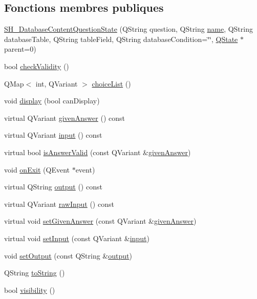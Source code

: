 \subsection*{Fonctions membres publiques}
\begin{DoxyCompactItemize}
\item 
\hyperlink{classSH__DatabaseContentQuestionState_ab26490ea519262a8f9ca72c000bf7313}{S\-H\-\_\-\-Database\-Content\-Question\-State} (Q\-String question, Q\-String \hyperlink{classSH__NamedObject_a970f265df31b28b2179bbbceb6170ac2}{name}, Q\-String database\-Table, Q\-String table\-Field, Q\-String database\-Condition=\char`\"{}\char`\"{}, \hyperlink{classQState}{Q\-State} $\ast$parent=0)
\item 
bool \hyperlink{classSH__QuestionState_a3ca5459c20ef591023c0572d8224146c}{check\-Validity} ()
\item 
Q\-Map$<$ int, Q\-Variant $>$ \hyperlink{classSH__DatabaseContentQuestionState_a15092c0fa6188ce6c4427d2ec9751055}{choice\-List} ()
\item 
void \hyperlink{classSH__InOutState_a918e8a7f5fe00dc16004e46eeee1281d}{display} (bool can\-Display)
\item 
virtual Q\-Variant \hyperlink{classSH__QuestionState_abde97c61175be95358ece622fd16593e}{given\-Answer} () const 
\item 
virtual Q\-Variant \hyperlink{classSH__InOutState_a04364c76d2fd8a3781e7b325955e5bd9}{input} () const 
\item 
virtual bool \hyperlink{classSH__DatabaseContentQuestionState_a9262aeba84c1bb7feff540ca5edb27a7}{is\-Answer\-Valid} (const Q\-Variant \&\hyperlink{classSH__QuestionState_abde97c61175be95358ece622fd16593e}{given\-Answer})
\item 
void \hyperlink{classSH__InOutState_a36636cba0d68476288bce5fd4c041db0}{on\-Exit} (Q\-Event $\ast$event)
\item 
virtual Q\-String \hyperlink{classSH__InOutState_a1a2fd4f34484125058e20730aaee7e46}{output} () const 
\item 
virtual Q\-Variant \hyperlink{classSH__DatabaseContentQuestionState_a344d9109e15509506b1b998d28392cac}{raw\-Input} () const 
\item 
virtual void \hyperlink{classSH__QuestionState_a9d285a34a7002fd05a7fa8ff9139c264}{set\-Given\-Answer} (const Q\-Variant \&\hyperlink{classSH__QuestionState_abde97c61175be95358ece622fd16593e}{given\-Answer})
\item 
virtual void \hyperlink{classSH__QuestionState_a331222d371d9c97392f35c84a5ef43e1}{set\-Input} (const Q\-Variant \&\hyperlink{classSH__InOutState_a04364c76d2fd8a3781e7b325955e5bd9}{input})
\item 
void \hyperlink{classSH__DatabaseContentQuestionState_aff932cdd7974baeea9a477cf0abc5ace}{set\-Output} (const Q\-String \&\hyperlink{classSH__InOutState_a1a2fd4f34484125058e20730aaee7e46}{output})
\item 
Q\-String \hyperlink{classSH__GenericState_a5480c5ee725fd801d8f6292cd4c803b8}{to\-String} ()
\item 
bool \hyperlink{classSH__InOutState_a8c496b2fe21a51a587c6e4409c0f37ec}{visibility} ()
\end{DoxyCompactItemize}
